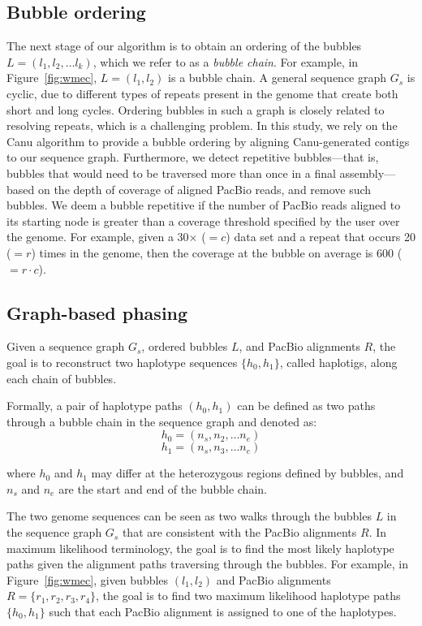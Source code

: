 \subsection{Bubble ordering}
The next stage of our algorithm is to obtain an ordering of the bubbles $L=(l_1, l_2, \ldots l_k)$, which we refer to as a \emph{bubble chain}. 
For example, in Figure~\ref{fig:wmec}, $L=(l_1, l_2)$ is a bubble chain.
A general sequence graph $G_s$ is cyclic, due to different types of repeats present in the genome that create both short and long cycles.
Ordering bubbles in such a graph is closely related to resolving repeats, which is a challenging problem.
In this study, we rely on the Canu algorithm \citep{koren2017canu} to provide a bubble ordering by aligning Canu-generated contigs to our sequence graph.
Furthermore, we detect repetitive bubbles---that is, bubbles that would need to be traversed more than once in a final assembly---based on the depth of coverage of aligned PacBio reads, and remove such bubbles.
We deem a bubble repetitive if the number of PacBio reads aligned to its starting node is greater than a coverage threshold specified by the user over the genome.
For example, given a 30$\times$ ($=c$) data set and a repeat that occurs 20 ($=r$) times in the genome, then the coverage at the bubble on average is 600 ($=r \cdot c$).

\subsection{Graph-based phasing}
\label{sec:phasing} 
Given a sequence graph $G_s$, ordered bubbles $L$, and PacBio alignments $R$, the goal is to reconstruct two haplotype sequences $\{h_0, h_1\}$, called haplotigs, along each chain of bubbles.
\begin{definition}
Formally, a pair of haplotype paths $(h_0, h_1)$ can be defined as two paths through a bubble chain in the sequence graph and denoted as:
\[h_0=(n_s, n_2, \ldots n_e )\]
\vspace{-3.5em}
\[h_1=(n_s, n_3, \ldots n_e )\]

where $h_0$ and $h_1$ may differ at the heterozygous regions defined by bubbles, and $n_s$ and $n_e$ are the start and end of the bubble chain.
\end{definition}

The two genome sequences can be seen as two walks through the bubbles $L$ in the sequence graph $G_s$ that are consistent with the PacBio alignments $R$.
In maximum likelihood terminology, the goal is to find the most likely haplotype paths given the alignment paths traversing through the bubbles.
For example, in Figure~\ref{fig:wmec}, given bubbles $(l_1, l_2)$ and PacBio alignments $R=\{r_1,r_2,r_3,r_4\}$, the goal is to find two maximum likelihood haplotype paths $\{h_0, h_1\}$ such that each PacBio alignment is assigned to one of the haplotypes. 

